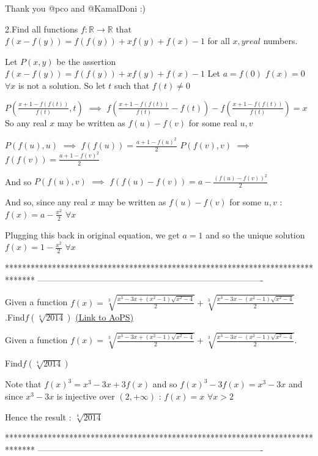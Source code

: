 \begin{solution}
	Thank you @pco and @KamalDoni  :)
\end{solution}



\begin{solution}
	\begin{tcolorbox}2.Find all functions $f:\mathbb{R} \rightarrow \mathbb{R} $ that 
$f(x-f(y))=f(f(y))+xf(y)+f(x)-1$ for all $x,y real$ numbers.\end{tcolorbox}
Let $P(x,y)$ be the assertion $f(x-f(y))=f(f(y))+xf(y)+f(x)-1$
Let $a=f(0)$
$f(x)=0$ $\forall x$ is not a solution. So let $t$ such that $f(t)\ne 0$

$P(\frac{x+1-f(f(t))}{f(t)},t)$ $\implies$ $f\left(\frac{x+1-f(f(t))}{f(t)}-f(t)\right)-f\left(\frac{x+1-f(f(t))}{f(t)}\right)=x$
So any real $x$ may be written as $f(u)-f(v)$ for some real $u,v$

$P(f(u),u)$ $\implies$ $f(f(u))=\frac{a+1-f(u)^2}2$
$P(f(v),v)$ $\implies$ $f(f(v))=\frac{a+1-f(v)^2}2$

And so $P(f(u),v)$ $\implies$ $f(f(u)-f(v))=a-\frac{(f(u)-f(v))^2}2$

And so, since any real $x$ may be written as $f(u)-f(v)$ for some $u,v$ : $f(x)=a-\frac{x^2}2$ $\forall x$

Plugging this back in original equation, we get $a=1$ and so the unique solution $\boxed{f(x)=1-\frac{x^2}2}$ $\forall x$
\end{solution}
*******************************************************************************
-------------------------------------------------------------------------------

\begin{problem}
	Given a function $f(x)=\sqrt[3]{\frac{x^3-3x+(x^2-1)\sqrt{x^2-4}}{2}}+\sqrt[3]{\frac{x^3-3x-(x^2-1)\sqrt{x^2-4}}{2}}$.Find$f(\sqrt[4]{2014})$
	\flushright \href{https://artofproblemsolving.com/community/c6h572387}{(Link to AoPS)}
\end{problem}



\begin{solution}
	\begin{tcolorbox}Given a function $f(x)=\sqrt[3]{\frac{x^3-3x+(x^2-1)\sqrt{x^2-4}}{2}}+\sqrt[3]{\frac{x^3-3x-(x^2-1)\sqrt{x^2-4}}{2}}$.

Find$f(\sqrt[4]{2014})$\end{tcolorbox}
Note that $f(x)^3=x^3-3x+3f(x)$ and so $f(x)^3-3f(x)=x^3-3x$ and since $x^3-3x$ is injective over $(2,+\infty)$ : $f(x)=x$ $\forall x>2$

Hence the result : $\boxed{\sqrt[4]{2014}}$
\end{solution}
*******************************************************************************
-------------------------------------------------------------------------------

